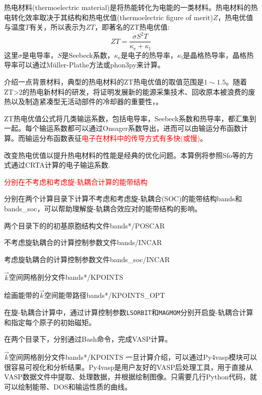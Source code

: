 热电材料\textrm{(thermoelectric material)}是将热能转化为电能的一类材料。热电材料的热电转化效率取决于其结构和热电优值\textrm{(thermoelectric figure of merit)}$Z$，热电优值与温度$T$有关，所以表示为$ZT$，即著名的\textrm{ZT}热电优值:
\begin{displaymath}
	ZT=\dfrac{\sigma S^2T}{\kappa_{\mathrm{e}}+\kappa_{\mathrm{l}}}
\end{displaymath}
这里$\sigma$是电导率，$S$是\textrm{Seebeck}系数，$\kappa_{\mathrm{e}}$是电子的热导率，$\kappa_{\mathrm{l}}$是晶格热导率，晶格热导率可以通过\textrm{M\"uller-Plathe}方法或\textrm{phon3py}来计算。

介绍一点背景材料，典型的热电材料的\textrm{ZT}热电优值的取值范围是$1\sim1.5$。随着\textrm{ZT>2}的热电新材料的研发，将证明发展新的能源采集技术、回收原本被浪费的废热以及制造紧凑型无活动部件的冷却器的重要性，。

\textrm{ZT}热电优值公式将几类输运系数，包括电导率，\textrm{Seebeck}系数和热导率，都汇集到一起。每个输运系数都可以通过\textrm{Onsager}系数导出，进而可以由输运分布函数计算。而输运分布函数表征\textcolor{red}{电子在材料中的传导方式有多快(或慢)}。

改变热电优值以提升热电材料的性能是经典的优化问题。本算例将参照\textrm{Sfo}等的方式通过\textrm{CRTA}计算的电子输运系数.

\textcolor{red}{分别在不考虑和考虑旋-轨耦合计算的能带结构}

分别在两个计算目录下计算不考虑和考虑旋-轨耦合\textrm{(SOC)}的能带结构\textrm{bands}和\textrm{bands\_soc}，可以帮助理解旋-轨耦合效应对的能带结构的影响。

两个目录下的的初基原胞结构文件\textrm{bands*/POSCAR}

不考虑旋轨耦合的计算控制参数文件\textrm{bands/INCAR}

考虑旋轨耦合的计算控制参数文件\textrm{bands\_soc/INCAR}

$\vec k$空间网格剖分文件\textrm{bands*/KPOINTS}

绘画能带的$\vec k$空间能带路径\textrm{bands*/KPOINTS\_OPT}

在旋-轨耦合计算中，通过计算控制参数\texttt{LSORBIT}和\texttt{MAGMOM}分别开启旋-轨耦合计算和指定每个原子的初始磁矩。

在两个目录下，分别通过\textrm{Bash}命令，完成\textrm{VASP}计算。

$\vec k$空间网格剖分文件\textrm{bands*/KPOINTS}
一旦计算介绍，可以通过\textrm{Py4vasp}模块可以很容易可视化和分析结果。\textrm{Py4vasp}是用户友好的\textrm{VASP}后处理工具，用于直接从\textrm{VASP}数据文件中提取、处理数据，并根据绘制图像。只需要几行\textrm{Python}代码，就可以绘制能带、\textrm{DOS}和输运性质的曲线。

